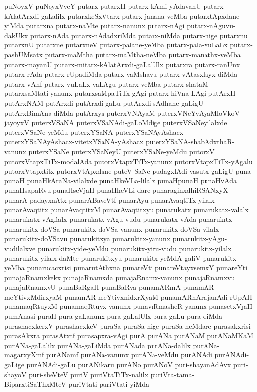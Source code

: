 {puNoyxV
puNoyxVveY
putarx
putarxH
putarx-kAmi-yAdavanU
putarx-kAlatArxdi-gaLalilx
putarxkeSxVtarx
putarx-janana-veMba
putarxtApxdane-yiMda
putarxna
putarx-naMte
putarx-nanunx
putarx-nAgi
putarx-nAguvu-dakUkx
putarx-nAda
putarx-nAdadxriMda
putarx-niMda
putarx-nige
putarxnu
putarxnU
putarxne
putarxneV
putarx-palane-yeMba
putarx-pala-vuLaLx
putarx-pashUMsatx
putarx-maMtha
putarx-maMtha-neMba
putarx-manathx-veMba
putarx-mayanU
putarx-mitarx-kAlatArxdi-gaLalUlx
putarxra
putarx-ranUnx
putarx-rAda
putarx-rUpadiMda
putarx-vaMshavu
putarx-vAtasxlayx-diMda
putarx-vAnf
putarx-vuLaLx-vaLAgu
putarx-veMba
putarx-shataM
putarxsaMtati-yanunx
putarxsaMpaTiTx-gAgi
putarx-hiVna-LAgi
putArxH
putArxNAM
putArxdi
putArxdi-gaLu
putArxdi-sAdhane-gaLigU
putArxBimAna-diMda
putArxya
puterxVNAyaM
puterxVNeYvAyaMloVkoV-jayoyxV
puterxVSaNA
puterxVSaNAdi-gaLoMdige
puterxVSaNeyilalxde
puterxVSaNe-yeMdu
puterxYSaNA
puterxYSaNAyAshacx
puterxYSaNAyAshacx-vitetxYSaNA-yAshacx
puterxYSaNA-shabAdxthaR-vanunx
puterxYSaNe
puterxYSaNeyU
puterxYSaNe-yeMdu
putorxV
putorxVtapxTiTx-modalAda
putorxVtapxTiTx-yanunx
putorxVtapxTiTx-yAgalu
putorxVtapxtitx
putorxVtApxdane
puteV-SaNe
pudagxlAdi-vasutx-gaLigU
puna
punaH
punaHkAraNa-vilalxde
punaHkeVLa-lilalx
punaHpunaH
punaHvAda
punaHsapaRvu
punaHseVjaH
punaHheVLi-dare
punaraginxdhiRSANxyX
punarA-padayxnAtx
punarABaveVtf
punarAyu
punarAvaqtiTx-yilalx
punarAvaqtitx
punarAvaqtitxM
punarAvaqtitxyu
punarukatx
punarukatx-valalx
punarukatx-vAgilalx
punarukatx-vAgu-vudu
punarukatx-vAda
punarukitx
punarukitx-doVSa
punarukitx-doVSa-vanunx
punarukitx-doVSa-vilalx
punarukitx-doVSavu
punarukitxya
punarukitx-yanunx
punarukitx-yAgu-vudilalxve
punarukitx-yide-yeMdu
punarukitx-yiru-vudu
punarukitx-yilalx
punarukitx-yilalx-daMte
punarukitxyu
punarukitx-yeMdA-galiV
punarukitx-yeMba
punarucacxrisi
punarutAthxna
punareVti
punareVtayxsemxY
punareYti
punajaRnamxkekx
punajaRnamxda
punajaRnamx-vanunx
punajaRnamxvu
punajaRnamxvU
punaBaRgaH
punaBaRva
punamARmA
punamAR-meYtivxMdirxyaM
punamAR-meYtivxnidxrXyaM
punamARhArajanAdi-rUpAH
punamaqRtuyxM
punamaqRtuyx-vanunx
punaviRmasheR-yanunx
punasetxVjaH
pumAnasi
puraH
pura-gaLanunx
pura-gaLalUlx
pura-gaLu
pura-diMda
purashacxkerxV
purashacxkeV
puraSa
puraSa-nige
puraSa-neMdare
purasakxrisi
purasAkxra
purasAtxtf
purasapxra-vAgi
purA
purANa
purANaM
purANaMKaM
purANa-gaLalilx
purANa-gaLiMda
purANada
purANa-dalilx
purANa-magarxyXmf
purANamf
purANa-vanunx
purANa-veMdu
purANAdi
purANAdi-gaLige
purANAdi-gaLu
purANikaru
purANo
purANoV
puri-shayanAdAvx
puri-shayoV
puri-sheVteV
puriV
puriVtaTiTx-nalilx
puriVta-tama-BiparxtiSaThxMteV
puriVtati
puriVtati-yiMda
}
